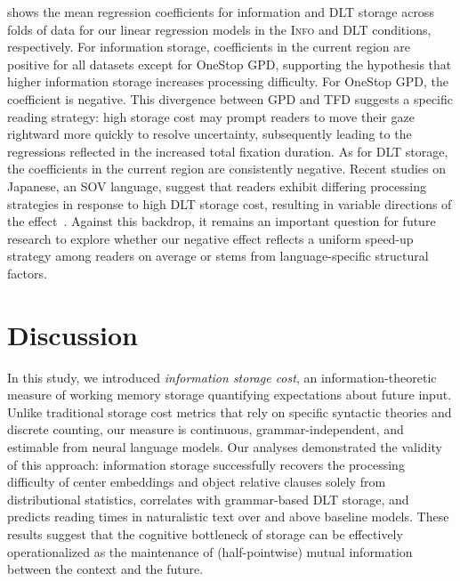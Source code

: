 \documentclass[11pt]{article}
\newcommand{\DLT}{\textcolor{cudOrange}{\textsc{DLT}}\xspace}
\newcommand{\Info}{\textcolor{cudBlue}{\textsc{Info}}\xspace}
\begin{document}
 shows the mean regression coefficients for information and DLT storage across folds of data for our linear regression models in the \Info and \DLT conditions, respectively.
For information storage, coefficients in the current region are positive for all datasets except for OneStop GPD, supporting the hypothesis that higher information storage increases processing difficulty.
For OneStop GPD, the coefficient is negative. This divergence between GPD and TFD suggests a specific reading strategy: high storage cost may prompt readers to move their gaze rightward more quickly to resolve uncertainty, subsequently leading to the regressions reflected in the increased total fixation duration.
As for DLT storage, the coefficients in the current region are consistently negative.
Recent studies on Japanese, an SOV language, suggest that readers exhibit differing processing strategies in response to high DLT storage cost, resulting in variable directions of the effect~\citep{isono-etal-ur,isono-kajikawa-2026}.
Against this backdrop, it remains an important question for future research to explore whether our negative effect reflects a uniform speed-up strategy among readers on average or stems from language-specific structural factors.

\section{Discussion}

In this study, we introduced \emph{information storage cost}, an information-theoretic measure of working memory storage quantifying expectations about future input.
Unlike traditional storage cost metrics that rely on specific syntactic theories and discrete counting, our measure is continuous, grammar-independent, and estimable from neural language models.
Our analyses demonstrated the validity of this approach: information storage successfully recovers the processing difficulty of center embeddings and object relative clauses solely from distributional statistics, correlates with grammar-based DLT storage, and predicts reading times in naturalistic text over and above baseline models.
These results suggest that the cognitive bottleneck of storage can be effectively operationalized as the maintenance of (half-pointwise) mutual information between the context and the future.
\end{document}
